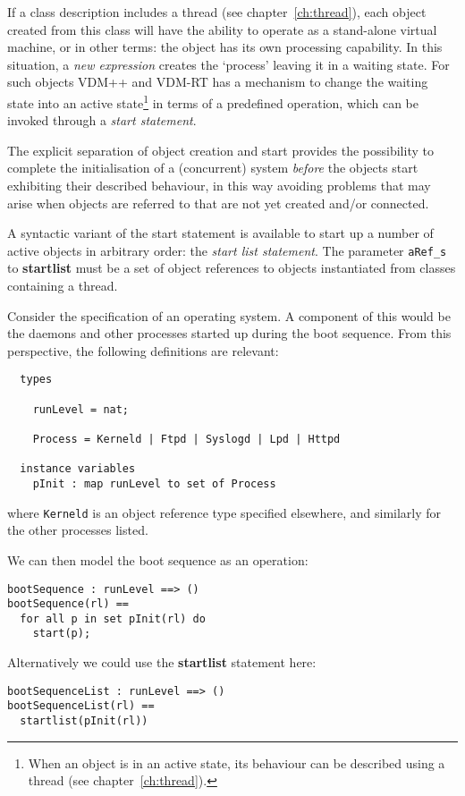 \documentclass{overturerepchap}
\newcommand{\keyw}[1]{{\bf\ttfamily #1}}
\begin{document}
{\begin{description}
If a class description includes a thread (see
chapter~\ref{ch:thread}), each object created from this class will
have the ability to operate as a stand-alone virtual machine, or in
other terms: the object has its own processing capability.  In this
situation, a {\it new expression} creates the `process' leaving it in
a waiting state.  For such objects VDM++ and VDM-RT has a mechanism to change
the waiting state into an active state\footnote{When an object is in
an active state, its behaviour can be described using a thread (see
chapter~\ref{ch:thread}).}  in terms of a predefined operation, which
can be invoked through a {\it start statement}.

The explicit separation of object creation and start provides the
possibility to complete the initialisation of a (concurrent) system
{\it before} the objects start exhibiting their described behaviour,
in this way avoiding problems that may arise when objects are referred
to that are not yet created and/or connected.

A syntactic variant of the start statement is available to start up a
number of active objects in arbitrary order: the {\it start list
statement}. The parameter {\tt aRef\_s} to \keyw{startlist} must be a
set of object references to objects instantiated from classes
containing a thread.

\item[Examples:]
Consider the specification of an operating system. A component of this
would be the daemons and other processes started up during the boot
sequence. From this perspective, the following definitions are
relevant:
\begin{lstlisting}
  types

    runLevel = nat;

    Process = Kerneld | Ftpd | Syslogd | Lpd | Httpd

  instance variables
    pInit : map runLevel to set of Process
\end{lstlisting}
where \texttt{Kerneld} is an object reference type specified
elsewhere, and similarly for the other processes listed.

We can then model the boot sequence as an operation:
\begin{lstlisting}
bootSequence : runLevel ==> ()
bootSequence(rl) ==
  for all p in set pInit(rl) do
    start(p);
\end{lstlisting}
Alternatively we could use the \keyw{startlist} statement here:
\begin{lstlisting}
bootSequenceList : runLevel ==> ()
bootSequenceList(rl) ==
  startlist(pInit(rl))
\end{lstlisting}
\end{description}

}
\end{document}
